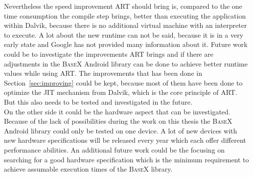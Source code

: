 Nevertheless the speed improvement ART should bring is, compared to the one time consumption the compile step brings, better than executing the application within Dalvik, because there is no additional virtual machine with an interpreter to execute.
A lot about the new runtime can not be said, because it is in a very early state and Google has not provided many information about it.
Future work could be to investigate the improvements ART brings and if there are adjustments in the \textsc{BaseX} Android library can be done to achieve better runtime values while using ART.
The improvements that has been done in Section~\ref{sec:improving} could be kept, because most of them have been done to optimize the JIT mechanism from Dalvik, which is the core principle of ART.
But this also needs to be tested and investigated in the future.\\
On the other side it could be the hardware aspect that can be investigated.
Because of the lack of possibilities during the work on this thesis the \textsc{BaseX} Android library could only be tested on one device.
A lot of new devices with new hardware specifications will be released every year which each offer different performance abilities.
An additional future work could be the focusing on searching for a good hardware specification which is the minimum requirement to achieve assumable execution times of the \textsc{BaseX} library.
